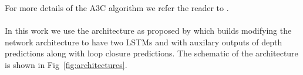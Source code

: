 For more details of the A3C algorithm we refer the reader to \cite{MnBaMiICML2016}.
\paragraph{\NavAiiiCDiDiiL{}}
In this work we use the \NavAiiiCDiDiiL{} architecture as proposed by \cite{MiPaViICLR2017} which builds modifying the network architecture to have two LSTMs and with auxilary outputs of depth predictions along with loop closure predictions.
The schematic of the architecture is shown in Fig~\ref{fig:architectures}.

